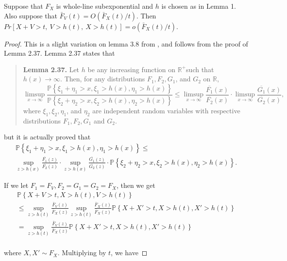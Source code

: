 \documentclass[../neurips_2024.tex]{subfiles}
\begin{document}
\begin{lemma}
 Suppose that \(F_X\) is whole-line subexponential and \(h\) is chosen as in Lemma 1. Also suppose that \(\bar F_V(t) = O(\bar F_X(t) / t)\). Then \(Pr[X+V>t,\ V>h(t),\ X > h(t)] = o(\bar F_X(t)/t).\)
 \end{lemma}
 
\begin{proof}

 This is a slight variation on lemma 3.8 from \citep{foss2013introduction}, and follows from the proof of Lemma 2.37. Lemma 2.37 states that

\begin{quote}
    \textbf{Lemma 2.37.} Let $h$ be any increasing function on $\mathbb{R}^{+}$such that $h(x) \rightarrow \infty$. Then, for any distributions $F_1, F_2, G_1$, and $G_2$ on $\mathbb{R}$,
$$
\limsup _{x \rightarrow \infty} \frac{\mathbb{P}\left\{\xi_1+\eta_1>x, \xi_1>h(x), \eta_1>h(x)\right\}}{\mathbb{P}\left\{\xi_2+\eta_2>x, \xi_2>h(x), \eta_2>h(x)\right\}} \leq \limsup _{x \rightarrow \infty} \frac{\overline{F_1}(x)}{\overline{F_2}(x)} \cdot \limsup _{x \rightarrow \infty} \frac{\overline{G_1}(x)}{\overline{G_2}(x)},
$$
where $\xi_1, \xi_2, \eta_1$, and $\eta_2$ are independent random variables with respective distributions $F_1, F_2, G_1$ and $G_2$.
\end{quote}

but it is actually proved that \begin{multline}\mathbb{P}\left\{\xi_1+\eta_1>x, \xi_1>h(x), \eta_1>h(x)\right\} \leq \\ \sup_{z > h(x)} \frac{\overline{F_1}(z)}{\overline{F_2}(z)} \cdot \sup_{z > h(x)} \frac{\overline{G_1}(z)}{\overline{G_2}(z)} \cdot {\mathbb{P}\left\{\xi_2+\eta_2>x, \xi_2>h(x), \eta_2>h(x)\right\}}.\end{multline}

If we let \(F_1 = F_V, F_2=G_1=G_2=F_X\), then we get  \begin{multline} \mathbb{P}\left\{X+V>t, X>h(t), V>h(t) \right\}  \\ \le \sup_{z > h(t)} \frac{\bar F_V(z)}{\bar F_X(z)} \sup_{z > h(t)} \frac{\bar F_X(z)}{\bar F_X(z)} {\mathbb{P}\left\{X+X'>t, X>h(t), X'>h(t)\right\}}\\ = \sup_{z > h(t)} \frac{\bar F_V(z)}{\bar F_X(z)} {\mathbb{P}\left\{X+X'>t, X>h(t), X'>h(t)\right\}}\\ \end{multline}

where \(X,X' \sim F_X\). Multiplying by \(t\), we have


\end{proof}
\end{document}
